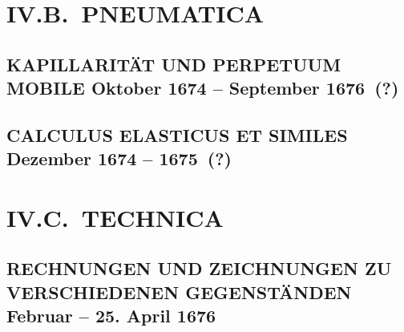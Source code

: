 \documentclass[%
fontsize=10pt,
]{scrbook}
\renewcommand*{\chapterheadstartvskip}{\vspace*{19.5ex}}	%
\renewcommand*{\chapterheadstartvskip}{\vspace*{0pt}}
\DeclareRobustCommand{\bracks}[1]{%
\textup{\lbrack}#1\textup{\rbrack}}
\begin{document}
\part[tocentry={IV.B.~PNEUMATICA (Zu Bd VIII, 1)},
head={IV.B.~PNEUMATICA}]%
{IV.B.~PNEUMATICA }	%
\renewcommand*{\chapterheadstartvskip}{\vspace*{0pt}}        %



\chapter[tocentry={Kapillarität und Perpetuum mobile
\enskip\bracks{Oktober 1674 -- September 1676~(?)}},
head={Kapillarität und Perpetuum mobile}]%
{\MakeUppercase{Kapillarität und Perpetuum mobile}
\newline\bracks{Oktober 1674 -- September 1676~(?)}}
\label{56216}





\chapter[tocentry={Calculus elasticus et similes
\enskip%
\bracks{%
Dezember 1674 -- 1675~(?)%
}%
},
head={Calculus elasticus et similes}]%
{\MakeUppercase{Calculus elasticus et similes}
\newline%
\bracks{%
Dezember 1674 -- 1675~(?)%
}%
}
\label{Cc2_847-1}






\part[tocentry={IV.C.~TECHNICA (Zu Bd VIII, 1)},
head={IV.C.~TECHNICA}]%
{IV.C.~TECHNICA }	%
\renewcommand*{\chapterheadstartvskip}{\vspace*{0pt}}        %


\chapter[tocentry={Rechnungen und Zeichnungen zu verschiedenen Gegenständen
\enskip\bracks{Februar -- 25. April 1676}},
head={Rechnungen und Zeichnungen zu verschiedenen Gegenständen}]%
{\MakeUppercase{Rechnungen und Zeichnungen zu verschiedenen Gegenständen}
\newline\bracks{Februar -- 25. April 1676}}
\label{Cc2_1381}

\end{document}
